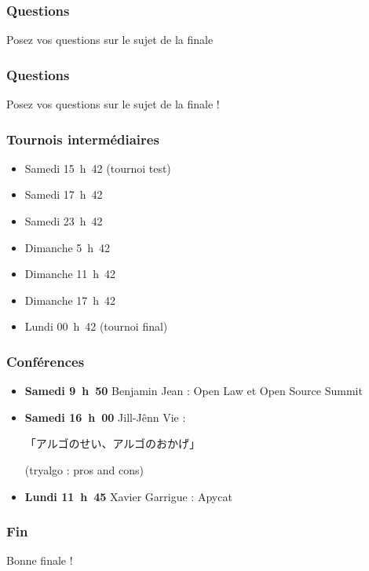 \documentclass{beamer}
\begin{document}
\begin{frame}
    \frametitle{Questions}
    Posez vos questions sur le sujet de la finale
\end{frame}

\begin{frame}
    \frametitle{Questions}
    Posez vos questions sur le sujet de la finale !
\end{frame}

\begin{frame}
    \frametitle{Tournois intermédiaires}
    \begin{itemize}
        \item Samedi 15~h~42 (tournoi test)
        \item Samedi 17~h~42
        \item Samedi 23~h~42
        \item Dimanche 5~h~42
        \item Dimanche 11~h~42
        \item Dimanche 17~h~42
        \item Lundi 00~h~42 (tournoi final)
    \end{itemize}
\end{frame}

\begin{frame}
    \frametitle{Conférences}
    \begin{itemize}
        \item \textbf{Samedi 9~h~50} Benjamin Jean : Open Law et Open Source Summit
        \item \textbf{Samedi 16~h~00} Jill-Jênn Vie : \begin{CJK}{UTF8}{min}「アルゴのせい、アルゴのおかげ」\end{CJK} (tryalgo : pros and cons)
        \item \textbf{Lundi 11~h~45} Xavier Garrigue : Apycat
    \end{itemize}
\end{frame}

\begin{frame}
    \frametitle{Fin}
    Bonne finale !
\end{frame}
\end{document}
